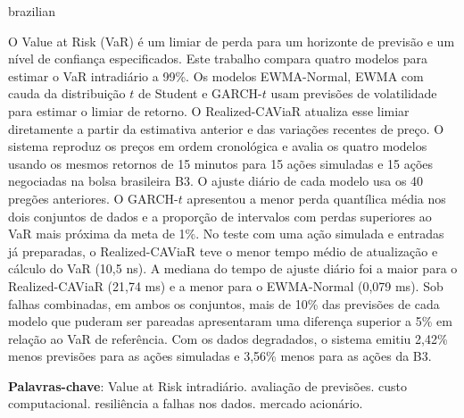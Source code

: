 \documentclass[
	12pt,				%
	openright,			%
	twoside,			%
	a4paper,
	chapter=TITLE,
	english				%
	]{abntex2}
\begin{document}
\setlength{\absparsep}{18pt} %
\begin{otherlanguage*}{brazilian}
\begin{resumo}[RESUMO]
O Value at Risk (VaR) é um limiar de perda para um horizonte de previsão e um nível de confiança especificados. Este trabalho compara quatro modelos para estimar o VaR intradiário a 99\%. Os modelos EWMA-Normal, EWMA com cauda da distribuição $t$ de Student e GARCH-$t$ usam previsões de volatilidade para estimar o limiar de retorno. O Realized-CAViaR atualiza esse limiar diretamente a partir da estimativa anterior e das variações recentes de preço. O sistema reproduz os preços em ordem cronológica e avalia os quatro modelos usando os mesmos retornos de 15 minutos para 15 ações simuladas e 15 ações negociadas na bolsa brasileira B3. O ajuste diário de cada modelo usa os 40 pregões anteriores. O GARCH-$t$ apresentou a menor perda quantílica média nos dois conjuntos de dados e a proporção de intervalos com perdas superiores ao VaR mais próxima da meta de 1\%. No teste com uma ação simulada e entradas já preparadas, o Realized-CAViaR teve o menor tempo médio de atualização e cálculo do VaR (10,5 ns). A mediana do tempo de ajuste diário foi a maior para o Realized-CAViaR (21,74 ms) e a menor para o EWMA-Normal (0,079 ms). Sob falhas combinadas, em ambos os conjuntos, mais de 10\% das previsões de cada modelo que puderam ser pareadas apresentaram uma diferença superior a 5\% em relação ao VaR de referência. Com os dados degradados, o sistema emitiu 2,42\% menos previsões para as ações simuladas e 3,56\% menos para as ações da B3.

\vspace{\onelineskip}

\noindent
\textbf{Palavras-chave}: Value at Risk intradiário. avaliação de previsões. custo computacional. resiliência a falhas nos dados. mercado acionário.
\end{resumo}
\end{otherlanguage*}
\end{document}
